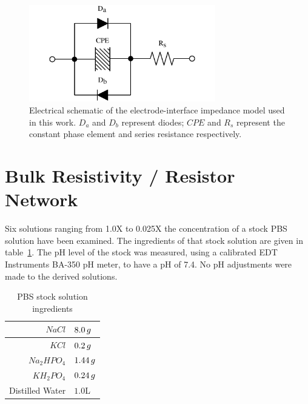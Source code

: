 \documentclass[journal, a4paper]{IEEEtran}
\begin{document}
\begin{figure}
    \begin{center}
        \includegraphics[width=230pt]{graphics/interfaceSchematic_noMemristive}
    \end{center}
    \caption{Electrical schematic of the electrode-interface impedance model used in this work. $D_{a}$ and $D_{b}$ represent diodes; $CPE$ and $R_{s}$ represent the constant phase element and series resistance respectively.}
    \label{fig:schematic}
\end{figure}

\section{{\color{blue}Bulk Resistivity / Resistor} Network }
\label{sect:resistorMesh}
Six solutions ranging from 1.0X to 0.025X the concentration of a stock PBS solution have been examined.
The ingredients of that stock solution are given in table~\ref{tab:PBSrecipe}.
The pH level of the stock was measured, using a calibrated EDT Instruments BA-350 pH meter, to have a pH of 7.4. No pH adjustments were made to the derived solutions.

\begin{table}
    \begin{center}
        \begin{tabular}{|r|l|}
            \hline
            $NaCl$ & $8.0\thinspace g$ \\ \hline
            $KCl$ & $0.2\thinspace g$ \\ \hline
            $Na_{2}HPO_{4}$ & $1.44\thinspace g$ \\ \hline
            $KH_{2}PO_{4}$ & $0.24\thinspace g$ \\ \hline
            Distilled Water & $1.0$\thinspace L \\ \hline
        \end{tabular}
    \end{center}
    \caption{PBS stock solution ingredients}
    \label{tab:PBSrecipe}
\end{table}
\end{document}
